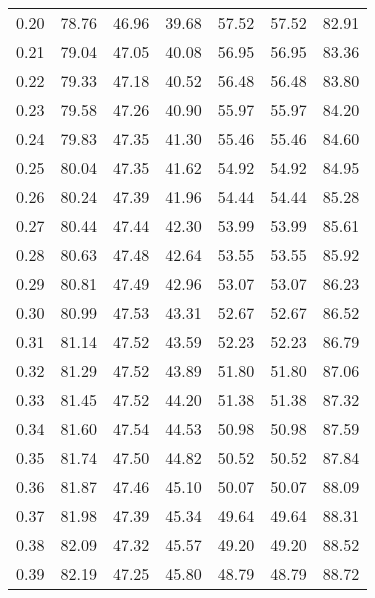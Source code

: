 \begin{tabular}{|c|c|c|c|c|c|c|}
      0.20 &     78.76 &     46.96 &      39.68 &   57.52 &      57.52 &         82.91 \\
      0.21 &     79.04 &     47.05 &      40.08 &   56.95 &      56.95 &         83.36 \\
      0.22 &     79.33 &     47.18 &      40.52 &   56.48 &      56.48 &         83.80 \\
      0.23 &     79.58 &     47.26 &      40.90 &   55.97 &      55.97 &         84.20 \\
      0.24 &     79.83 &     47.35 &      41.30 &   55.46 &      55.46 &         84.60 \\
      0.25 &     80.04 &     47.35 &      41.62 &   54.92 &      54.92 &         84.95 \\
      0.26 &     80.24 &     47.39 &      41.96 &   54.44 &      54.44 &         85.28 \\
      0.27 &     80.44 &     47.44 &      42.30 &   53.99 &      53.99 &         85.61 \\
      0.28 &     80.63 &     47.48 &      42.64 &   53.55 &      53.55 &         85.92 \\
      0.29 &     80.81 &     47.49 &      42.96 &   53.07 &      53.07 &         86.23 \\
      0.30 &     80.99 &     47.53 &      43.31 &   52.67 &      52.67 &         86.52 \\
      0.31 &     81.14 &     47.52 &      43.59 &   52.23 &      52.23 &         86.79 \\
      0.32 &     81.29 &     47.52 &      43.89 &   51.80 &      51.80 &         87.06 \\
      0.33 &     81.45 &     47.52 &      44.20 &   51.38 &      51.38 &         87.32 \\
      0.34 &     81.60 &     47.54 &      44.53 &   50.98 &      50.98 &         87.59 \\
      0.35 &     81.74 &     47.50 &      44.82 &   50.52 &      50.52 &         87.84 \\
      0.36 &     81.87 &     47.46 &      45.10 &   50.07 &      50.07 &         88.09 \\
      0.37 &     81.98 &     47.39 &      45.34 &   49.64 &      49.64 &         88.31 \\
      0.38 &     82.09 &     47.32 &      45.57 &   49.20 &      49.20 &         88.52 \\
      0.39 &     82.19 &     47.25 &      45.80 &   48.79 &      48.79 &         88.72 \\

\end{tabular}
